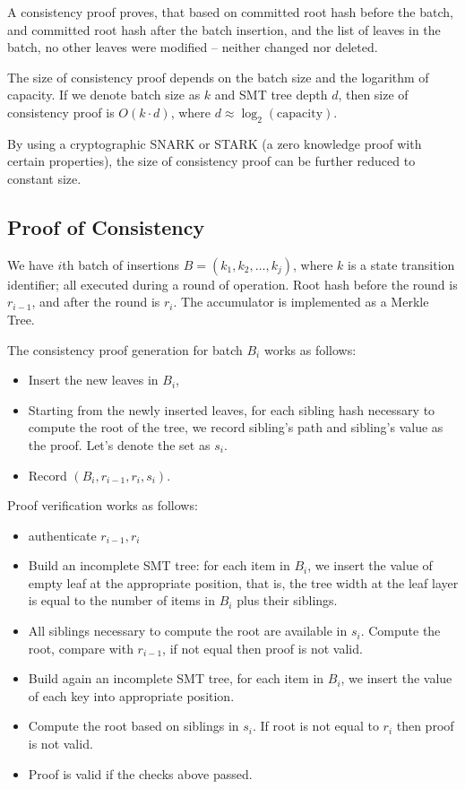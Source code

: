 A consistency proof proves, that based on committed root hash before the batch, and committed root hash after the batch insertion, and the list of leaves in the batch, no other leaves were modified -- neither changed nor deleted.

The size of consistency proof depends on the batch size and the logarithm of capacity. If we denote batch size as $k$ and SMT tree depth $d$, then size of consistency proof is $O(k \cdot d)$, where $d \approx \log_2(\text{capacity})$.

By using a cryptographic SNARK or STARK (a zero knowledge proof with certain properties), the size of consistency proof can be further reduced to constant size.


\subsection{Proof of Consistency}

We have $i$th batch of insertions $B = (k_1, k_2, \dots, k_j)$, where $k$ is a state transition identifier; all executed during a round of operation. Root hash before the round is $r_{i-1}$, and after the round is $r_i$. The accumulator is implemented as a Merkle Tree.

The consistency proof generation for batch $B_i$ works as follows:

\begin{itemize}
    \item Insert the new leaves in $B_i$,
    \item Starting from the newly inserted leaves, for each sibling hash necessary to compute the root of the tree, we record sibling's path and sibling's value as the proof. Let's denote the set as $s_i$.
    \item Record $(B_i, r_{i-1}, r_i, s_i)$.
\end{itemize}

Proof verification works as follows:
\begin{itemize}
    \item authenticate $r_{i-1}, r_i$
    \item Build an incomplete SMT tree: for each item in $B_i$, we insert the value of empty leaf at the appropriate position, that is, the tree width at the leaf layer is equal to the number of items in $B_i$ plus their siblings.
    \item All siblings necessary to compute the root are available in $s_i$. Compute the root, compare with $r_{i-1}$, if not equal then proof is not valid.
    \item Build again an incomplete SMT tree, for each item in $B_i$, we insert the value of each key into appropriate position.
    \item Compute the root based on siblings in $s_i$. If root is not equal to $r_i$ then proof is not valid.
    \item Proof is valid if the checks above passed.
\end{itemize}

